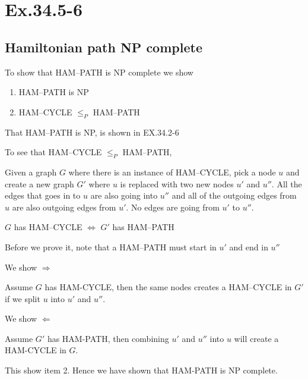 \section*{Ex.34.5-6}
\subsection*{Hamiltonian path NP complete}

To show that HAM--PATH is NP complete we show
\begin{enumerate}[]
	\item HAM--PATH is NP
	\item HAM--CYCLE $\leq_P$ HAM--PATH
\end{enumerate}
That HAM--PATH is NP, is shown in EX.34.2-6

To see that HAM--CYCLE $\leq_P$ HAM--PATH,

Given a graph $G$ where there is an instance of HAM--CYCLE, pick a node $u$ and create a new graph $G'$ where $u$ is replaced with two new nodes $u'$ and $u''$. All the edges that goes in to $u$ are also going into $u''$ and all of the outgoing edges from $u$ are also outgoing edges from $u'$. No edges are going from $u'$ to $u''$. 

$G$ has HAM--CYCLE $\Leftrightarrow$ $G'$ has HAM--PATH

Before we prove it, note that a HAM--PATH must start in $u'$ and end in $u''$

We show $\Rightarrow$

Assume $G$ has HAM-CYCLE, then the same nodes creates a HAM--CYCLE in $G'$ if we split $u$ into $u'$ and $u''$.

We show $\Leftarrow$

Assume $G'$ has HAM-PATH, then combining $u'$ and $u''$ into $u$ will create a HAM-CYCLE in $G$.


This show item 2. Hence we have shown that HAM-PATH is NP complete.
